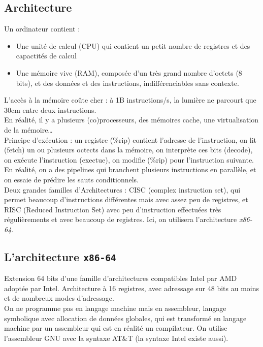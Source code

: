 \documentclass{cours}
\begin{document}
\subsection{Architecture}
Un ordinateur contient : 
\begin{itemize}
    \item Une unité de calcul (CPU) qui contient un petit nombre de registres et des capactités de calcul
    \item Une mémoire vive (RAM), composée d'un très grand nombre d'octets (8 bits), et des données et des instructions, indifférenciables sans contexte.
\end{itemize}
L'accès à la mémoire coûte cher : à 1B instructions/s, la lumière ne parcourt que 30cm entre deux instructions.\\
En réalité, il y a plusieurs (co)processeurs, des mémoires cache, une virtualisation de la mémoire\ldots\\
Principe d'exécution : un registre (\%rip) contient l'adresse de l'instruction, on lit (fetch) un ou plusieurs octects dans la mémoire, on interprète ces bits (decode), on exécute l'instruction (exectue), on modifie (\%rip) pour l'instruction suivante. En réalité, on a des pipelines qui branchent plusieurs instructions en parallèle, et on essaie de prédire les sauts conditionnels. \\
Deux grandes familles d'Architectures : CISC (complex instruction set), qui permet beaucoup d'instructions différentes mais avec assez peu de registres, et RISC (Reduced Instruction Set) avec peu d'instruction effectuées très régulièrements et avec beaucoup de registres. Ici, on utilisera l'architecture \textit{x86-64}.

\subsection{L'architecture \texttt{x86-64}}
Extension 64 bits d'une famille d'architectures compatibles Intel par AMD adoptée par Intel. Architecture à 16 registres, avec adressage sur 48 bits au moins et de nombreux modes d'adressage. \\
On ne programme pas en langage machine mais en assembleur, langage symbolique avec allocation de données globales, qui est transformé en langage machine par un assembleur qui est en réalité un compilateur. On utilise l'assembleur GNU avec la syntaxe AT\&T (la syntaxe Intel existe aussi).
\end{document}
